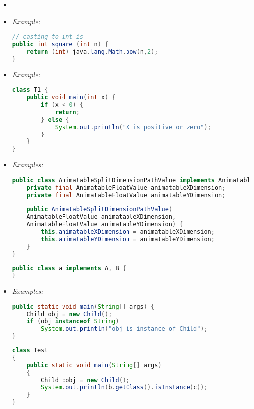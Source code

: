 \begin{itemize}
	\item {}
	
	\item {}
	{\it Example:}
\begin{lstlisting}[language=Java]
// casting to int is 
public int square (int n) {
	return (int) java.lang.Math.pow(n,2);
}
\end{lstlisting}

	\item {}
	{\it Example:}
	\begin{lstlisting}[language=Java]
class T1 {
	public void main(int x) {
		if (x < 0) {
			return;
		} else {
			System.out.println("X is positive or zero");
		}
	}
}
\end{lstlisting}

	\item {}
	{\it Examples:}
	\begin{lstlisting}[language=Java]
public class AnimatableSplitDimensionPathValue implements AnimatableValue<PointF, PointF> {
	private final AnimatableFloatValue animatableXDimension;
	private final AnimatableFloatValue animatableYDimension;
	
	public AnimatableSplitDimensionPathValue(
	AnimatableFloatValue animatableXDimension,
	AnimatableFloatValue animatableYDimension) {
		this.animatableXDimension = animatableXDimension;
		this.animatableYDimension = animatableYDimension;
	}
}
\end{lstlisting}
\begin{lstlisting}[language=Java]
public class a implements A, B {
}
\end{lstlisting}

	\item {}
{\it Examples:}
	\begin{lstlisting}[language=Java]
public static void main(String[] args) {
	Child obj = new Child();
	if (obj instanceof String)
		System.out.println("obj is instance of Child");
}
\end{lstlisting}
\begin{lstlisting}[language=Java]
class Test
{
	public static void main(String[] args)
	{
		Child cobj = new Child();
		System.out.println(b.getClass().isInstance(c));
	}
}
\end{lstlisting}


\end{itemize}
